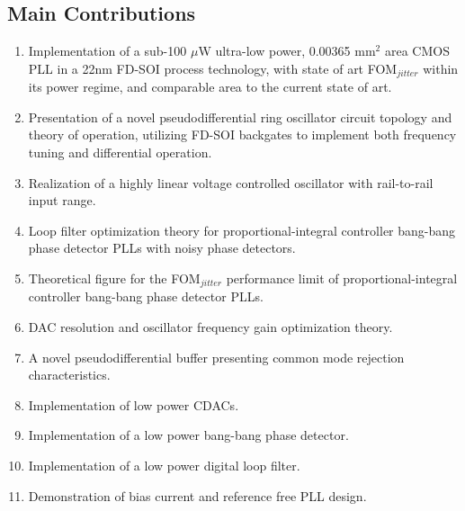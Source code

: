 \vspace{1em}

\subsection{Main Contributions}
\begin{enumerate}[itemsep=0pt,label=\protect\mycirc{\arabic*}]
	\setlength\itemsep{-0.8em}
	\item Implementation of a sub-100 $\mu$W ultra-low power, 0.00365 mm$^2$ area CMOS PLL in a 22nm FD-SOI process technology, with state of art FOM$_{jitter}$ within its power regime, and comparable area to the current state of art.
	\item Presentation of a novel pseudodifferential ring oscillator circuit topology and theory of operation, utilizing FD-SOI backgates to implement both frequency tuning and differential operation.
	\item Realization of a highly linear voltage controlled oscillator with rail-to-rail input range. 
	\item Loop filter optimization theory for proportional-integral controller bang-bang phase detector PLLs with noisy phase detectors.
	\item Theoretical figure for the FOM$_{jitter}$ performance limit of proportional-integral controller bang-bang phase detector PLLs.
	\item DAC resolution and oscillator frequency gain optimization theory.
	\item A novel pseudodifferential buffer presenting common mode rejection characteristics.
	\item Implementation of low power CDACs.
	\item Implementation of a low power bang-bang phase detector.
	\item Implementation of a low power digital loop filter.
	\item Demonstration of bias current and reference free PLL design.
\end{enumerate}

